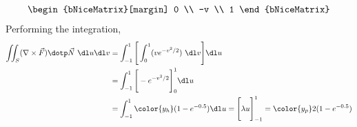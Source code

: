 \begin{enumerate}
\begin{align}
\begin{bNiceMatrix}[margin]
                                            0 \\ -v \\ 1
                                        \end{bNiceMatrix}
          \end{align}
          Performing the integration,
          \begin{align}
              \iint_S (\nabla \times \vec{F}) \dotp \vec{N}\ \dl u \dl v
               & = \int_{-1}^{1} \Bigg[ \int_{0}^{1} (v e^{-v^2/2})\ \dl v \Bigg]
              \dl u                                                               \\
               & = \int_{-1}^{1} \Bigg[ -e^{-v^2/2} \Bigg]_{0}^{1} \dl u          \\
               & = \int_{-1}^{1} {\color{y_h}(1 - e^{-0.5})} \dl u
              =  \Bigg[ \lambda u \Bigg]_{-1}^{1} = \color{y_p} 2(1 -e^{-0.5})
          \end{align}


\end{enumerate}
